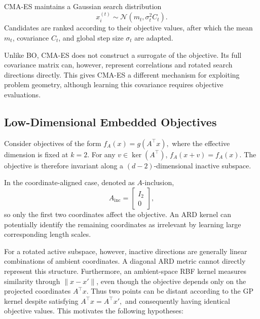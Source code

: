 \documentclass[10pt]{article}
\begin{document}
CMA-ES maintains a Gaussian search distribution
\begin{equation}
    x_i^{(t)}
    \sim
    \mathcal{N}\!\left(m_t,\sigma_t^2 C_t\right).
\end{equation}
Candidates are ranked according to their objective values, after which the mean $m_t$, covariance $C_t$, and global step size $\sigma_t$ are adapted.

Unlike BO, CMA-ES does not construct a surrogate of the objective. Its full covariance matrix can, however, represent correlations and rotated search directions directly. This gives CMA-ES a different mechanism for exploiting problem geometry, although learning this covariance requires objective evaluations.


\subsection{Low-Dimensional Embedded Objectives}

Consider objectives of the form
$
    f_A(x)=g(A^\top x),
$
where the effective dimension is fixed at $k=2$.
For any
$
    v\in\ker(A^\top)$, $f_A(x+v)=f_A(x).
$
The objective is therefore invariant along a $(d-2)$-dimensional inactive subspace.

In the coordinate-aligned case, denoted as $A$-inclusion,
\begin{equation}
    A_{\mathrm{inc}}
    =
    \begin{bmatrix}
        I_2\\
        0
    \end{bmatrix},
\end{equation}
so only the first two coordinates affect the objective. An ARD kernel can potentially identify the remaining coordinates as irrelevant by learning large corresponding length scales.

For a rotated active subspace, however, inactive directions are generally linear combinations of ambient coordinates. A diagonal ARD metric cannot directly represent this structure. Furthermore, an ambient-space RBF kernel measures similarity through $\|x-x'\|$, even though the objective depends only on the projected coordinates $A^\top x$. Thus two points can be distant according to the GP kernel despite satisfying
$
    A^\top x=A^\top x',
$
and consequently having identical objective values. This motivates the following hypotheses:
\end{document}
